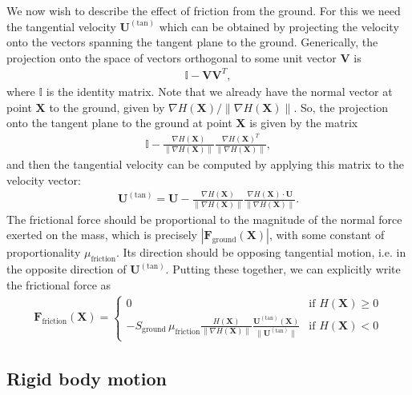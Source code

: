 \documentclass[10pt]{article}
\newcommand{\bs}[1]{{\boldsymbol #1}}
\begin{document}
We now wish to describe the effect of friction from the ground.  For this we need the tangential velocity ${\bs U}^{(\text{tan})}$ which can be obtained by projecting the velocity onto the vectors spanning the tangent plane to the ground.  Generically, the projection onto the space of vectors orthogonal to some unit vector ${\bs V}$ is 
\begin{align*}
\mathbb{I} - {\bs V} {\bs V}^T,
\end{align*}
where $\mathbb{I}$ is the identity matrix.  Note that we already have the normal vector at point ${\bs X}$ to the ground, given by  $\nabla H({\bs X}) / \|\nabla H({\bs X})\|$.  So, the projection onto the tangent plane to the ground at point ${\bs X}$ is given by the matrix
\begin{align*}
\mathbb{I} -\frac{\nabla H({\bs X})}{\|\nabla H({\bs X})\|}\frac{\nabla H({\bs X})^T}{\|\nabla H({\bs X})\|},
\end{align*}
and then the tangential velocity can be computed by applying this matrix to the velocity vector:
\begin{align*}
{\bs U}^{(\text{tan})} = {\bs U} -\frac{\nabla H({\bs X})}{\|\nabla H({\bs X})\|}\frac{\nabla H({\bs X}) \cdot {\bs U}}{\|\nabla H({\bs X})\|}.
\end{align*}
The frictional force should be proportional to the magnitude of the normal force exerted on the mass, which is precisely $|{\bs F}_\text{ground}({\bs X})|$, with some constant of proportionality $\mu_\text{friction}$.  Its direction should be opposing tangential motion, i.e. in the opposite direction of ${\bs U}^{(\text{tan})}$.  Putting these together, we can explicitly write the frictional force as
\begin{align*}
{\bs F}_\text{friction}({\bs X}) = 
\begin{cases}
0 & \text{if }H({\bs X}) \geq 0 \\
-S_\text{ground}\,\mu_\text{friction} \frac{H({\bs X})}{\|\nabla H({\bs X})\|} \frac{{\bs U}^{(\text{tan})}({\bs X})}{\|{\bs U}^{(\text{tan})}\|} & \text{if }H({\bs X}) < 0
\end{cases}
\end{align*}

\subsection{Rigid body motion}
\end{document}
